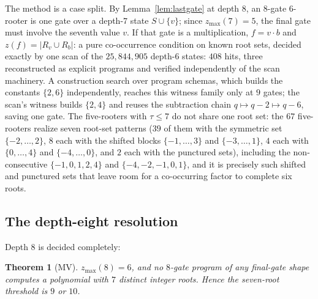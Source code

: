 \documentclass[11pt]{article}
\newtheorem{theorem}{Theorem}[section]
\theoremstyle{definition}
\theoremstyle{remark}
\newcommand{\zmax}{z_{\max}}
\begin{document}
The method is a case split. By Lemma~\ref{lem:lastgate} at depth $8$, an $8$-gate
$6$-rooter is one gate over a depth-$7$ state $S \cup \{v\}$; since
$\zmax(7) = 5$, the final gate must involve the seventh value $v$. If that gate is a
multiplication, $f = v \cdot b$ and $z(f) = |R_v \cup R_b|$: a pure co-occurrence
condition on known root sets, decided exactly by one scan of the $25{,}844{,}905$
depth-$6$ states: $408$ hits, three reconstructed as explicit
programs and verified independently of the scan machinery. A construction search over
program schemas, which builds the constants $\{2, 6\}$ independently, reaches this
witness family only at $9$ gates; the scan's witness builds $\{2, 4\}$ and reuses the
subtraction chain $q \mapsto q-2 \mapsto q-6$, saving one gate. The five-rooters with
$\tau \le 7$ do not share one root set: the $67$ five-rooters realize seven root-set
patterns ($39$ of them with the symmetric set $\{-2,\dots,2\}$, $8$ each with the shifted blocks
$\{-1,\dots,3\}$ and $\{-3,\dots,1\}$, $4$ each with $\{0,\dots,4\}$ and $\{-4,\dots,0\}$, and $2$ each
with the punctured sets), including the
non-consecutive $\{-1,0,1,2,4\}$ and $\{-4,-2,-1,0,1\}$, and it is precisely such
shifted and punctured sets that leave room for a co-occurring factor to complete six
roots.

\subsection{The depth-eight resolution}\label{sec:depth8}

Depth $8$ is decided completely:

\begin{theorem}[MV]\label{thm:depth8}
$\zmax(8) = 6$, and no $8$-gate program of \emph{any} final-gate shape computes a
polynomial with $7$ distinct integer roots. Hence the seven-root threshold is
$9$ or $10$.
\end{theorem}
\end{document}

